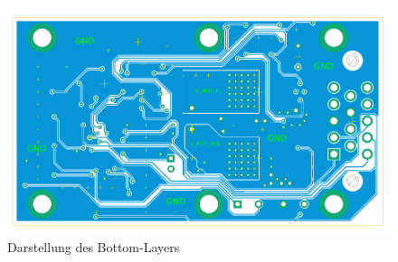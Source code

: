\begin{figure}[H]%
\centering
\includegraphics[width=400pt]{./Bilder/bottom2}%
\caption{Darstellung des Bottom-Layers}%
\label{fig:bot}%
\end{figure}

\newpage
